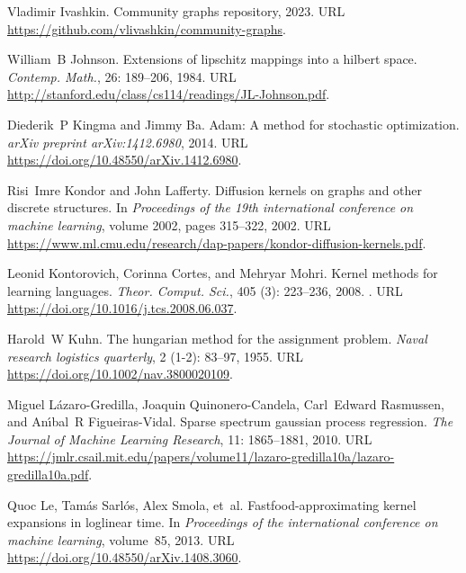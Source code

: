 \begin{thebibliography}{76}
Vladimir Ivashkin.
\newblock Community graphs repository, 2023.
\newblock URL \url{https://github.com/vlivashkin/community-graphs}.

William~B Johnson.
\newblock Extensions of lipschitz mappings into a hilbert space.
\newblock \emph{Contemp. Math.}, 26: 189--206, 1984.
\newblock URL \url{http://stanford.edu/class/cs114/readings/JL-Johnson.pdf}.

Diederik~P Kingma and Jimmy Ba.
\newblock Adam: A method for stochastic optimization.
\newblock \emph{arXiv preprint arXiv:1412.6980}, 2014.
\newblock URL \url{https://doi.org/10.48550/arXiv.1412.6980}.

Risi~Imre Kondor and John Lafferty.
\newblock Diffusion kernels on graphs and other discrete structures.
\newblock In \emph{Proceedings of the 19th international conference on machine learning}, volume 2002, pages 315--322, 2002.
\newblock URL \url{https://www.ml.cmu.edu/research/dap-papers/kondor-diffusion-kernels.pdf}.

Leonid Kontorovich, Corinna Cortes, and Mehryar Mohri.
\newblock Kernel methods for learning languages.
\newblock \emph{Theor. Comput. Sci.}, 405 (3): 223--236, 2008.
\newblock {}.
\newblock URL \url{https://doi.org/10.1016/j.tcs.2008.06.037}.

Harold~W Kuhn.
\newblock The hungarian method for the assignment problem.
\newblock \emph{Naval research logistics quarterly}, 2 (1-2): 83--97, 1955.
\newblock URL \url{https://doi.org/10.1002/nav.3800020109}.

Miguel L{\'a}zaro-Gredilla, Joaquin Quinonero-Candela, Carl~Edward Rasmussen, and An{\'\i}bal~R Figueiras-Vidal.
\newblock Sparse spectrum gaussian process regression.
\newblock \emph{The Journal of Machine Learning Research}, 11: 1865--1881, 2010.
\newblock URL \url{https://jmlr.csail.mit.edu/papers/volume11/lazaro-gredilla10a/lazaro-gredilla10a.pdf}.

Quoc Le, Tam{\'a}s Sarl{\'o}s, Alex Smola, et~al.
\newblock Fastfood-approximating kernel expansions in loglinear time.
\newblock In \emph{Proceedings of the international conference on machine learning}, volume~85, 2013.
\newblock URL \url{https://doi.org/10.48550/arXiv.1408.3060}.


\end{thebibliography}
